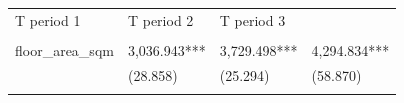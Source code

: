 \documentclass[]{book}
\begin{document}
\begin{longtable}[]{@{}llll@{}}
\begin{minipage}[t]{0.24\columnwidth}
T period 1\strut
\end{minipage} & \begin{minipage}[t]{0.24\columnwidth}\raggedright\strut
T period 2\strut
\end{minipage} & \begin{minipage}[t]{0.24\columnwidth}\raggedright\strut
T period 3\strut
\end{minipage}\tabularnewline
\begin{minipage}[t]{0.17\columnwidth}\raggedright\strut
\strut
\end{minipage} & \begin{minipage}[t]{0.24\columnwidth}\raggedright\strut
\strut
\end{minipage} & \begin{minipage}[t]{0.24\columnwidth}\raggedright\strut
\strut
\end{minipage} & \begin{minipage}[t]{0.24\columnwidth}\raggedright\strut
\strut
\end{minipage}\tabularnewline
\begin{minipage}[t]{0.17\columnwidth}\raggedright\strut
floor\_area\_sqm\strut
\end{minipage} & \begin{minipage}[t]{0.24\columnwidth}\raggedright\strut
3,036.943***\strut
\end{minipage} & \begin{minipage}[t]{0.24\columnwidth}\raggedright\strut
3,729.498***\strut
\end{minipage} & \begin{minipage}[t]{0.24\columnwidth}\raggedright\strut
4,294.834***\strut
\end{minipage}\tabularnewline
\begin{minipage}[t]{0.17\columnwidth}\raggedright\strut
\strut
\end{minipage} & \begin{minipage}[t]{0.24\columnwidth}\raggedright\strut
(28.858)\strut
\end{minipage} & \begin{minipage}[t]{0.24\columnwidth}\raggedright\strut
(25.294)\strut
\end{minipage} & \begin{minipage}[t]{0.24\columnwidth}\raggedright\strut
(58.870)\strut
\end{minipage}\tabularnewline
\begin{minipage}[t]{0.17\columnwidth}\raggedright\strut
\strut
\end{minipage} & \begin{minipage}[t]{0.24\columnwidth}\raggedright\strut

\end{minipage}
\end{longtable}
\end{document}
